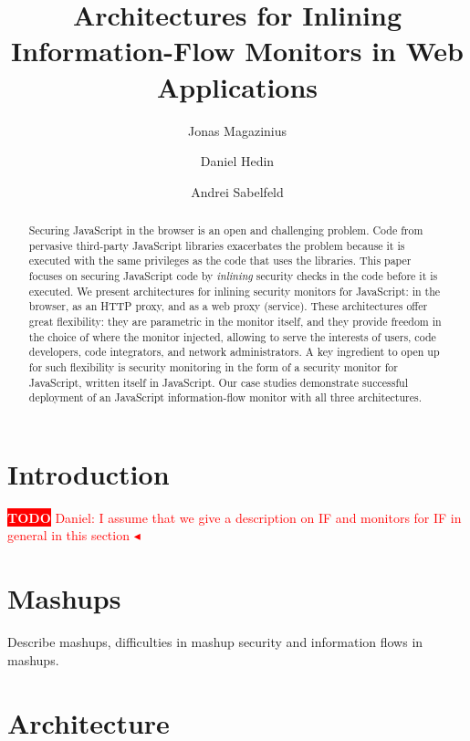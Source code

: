 \documentclass{llncs}
\title{Architectures for Inlining Information-Flow Monitors in Web Applications}
\author{Jonas Magazinius \and Daniel Hedin \and Andrei Sabelfeld}
\institute{Chalmers University of Technology, Gothenburg, Sweden}
\newcommand{\todo}[1]{\colorbox{red}{\textcolor{white}{\sffamily\bfseries\scriptsize TODO}} \textcolor{red}{#1} \textcolor{red}{$\blacktriangleleft$}}
\begin{document}
\maketitle



\begin{abstract}
Securing JavaScript in the browser is an open and challenging
problem. Code from pervasive third-party JavaScript libraries exacerbates the
problem because it is executed with the same privileges as the code
that uses the libraries.
%
This paper focuses on securing JavaScript code by \emph{inlining}
security checks in the code before it is executed. We present
architectures for inlining security monitors for JavaScript: in
the browser, as an HTTP proxy, and as a web proxy (service). 
%
These architectures offer great flexibility: they are parametric in the monitor itself,
and they provide freedom in the choice of where the monitor
injected, allowing to serve the interests of users, code developers, code
integrators, and network administrators.
%
A key ingredient to open up for such flexibility is security monitoring in the form of a
security monitor for JavaScript, written itself in JavaScript.
%
Our case studies demonstrate successful deployment of an JavaScript
information-flow monitor with all three architectures.
\end{abstract}










\section{Introduction}
\label{sec:intro}

\todo{Daniel: I assume that we give a description on IF and monitors for IF in general in this section}

\section{Mashups}
\label{sec:mash}

Describe mashups, difficulties in mashup security and information flows in mashups.

\section{Architecture}
\label{sec:arch}
\end{document}
